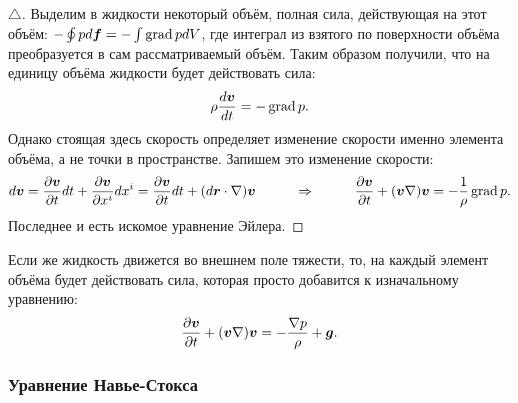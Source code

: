 \begin{to_thr}
\phantom{239}

\begin{proof}[$\triangle$]
	Выделим в жидкости некоторый объём, полная сила, действующая на этот объём: $- \oint p d \mbox{\boldmath $f$} = - \int \mathop{\mathrm{grad}}\nolimits p d V$, где интеграл из взятого по поверхности объёма преобразуется в сам рассматриваемый объём.
	Таким образом получили, что на единицу объёма жидкости будет действовать сила:
	\begin{equation*}
		\rho \frac{d \mbox{\boldmath $v$}}{d t} = - \mathop{\mathrm{grad}}\nolimits p.
	\end{equation*}
	Однако стоящая здесь скорость определяет изменение скорости именно элемента объёма, а не точки в пространстве.
	Запишем это изменение скорости:
	\begin{equation*}
		d \mbox{\boldmath $v$} 
		=
		 \frac{\partial \mbox{\boldmath $v$}}{\partial t} d t + \frac{\partial \mbox{\boldmath $v$}}{\partial x^i} d x^i 
		= 
		\frac{\partial \mbox{\boldmath $v$}}{\partial t} d t + (d \mbox{\boldmath $r$} \cdot \nabla) \mbox{\boldmath $v$}
		\hspace*{1 cm}
		\Rightarrow
		\hspace*{1 cm}
		\frac{\partial \mbox{\boldmath $v$}}{\partial t} + (\mbox{\boldmath $v$} \nabla) \mbox{\boldmath $v$} = - \frac{1}{\rho} \mathop{\mathrm{grad}}\nolimits p.
	\end{equation*}
	Последнее и есть искомое уравнение Эйлера.
\end{proof}
\end{to_thr}

Если же жидкость движется во внешнем поле тяжести, то, на каждый элемент объёма будет действовать сила, которая просто добавится к изначальному уравнению: 
\begin{equation*}
	\frac{\partial \mbox{\boldmath $v$}}{\partial t} + (\mbox{\boldmath $v$} \nabla) \mbox{\boldmath $v$} = - \frac{\nabla p}{\rho} + \mbox{\boldmath $g$}.
\end{equation*}

\subsubsection*{Уравнение Навье-Стокса}

